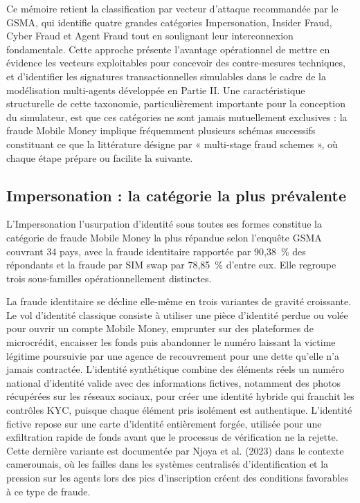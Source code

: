 \documentclass[11pt,a4paper,oneside]{report}
\theoremstyle{definition}
\theoremstyle{remark}
\begin{document}
Ce mémoire retient la classification par vecteur d'attaque recommandée par le GSMA, qui identifie quatre grandes catégories  Impersonation, Insider Fraud, Cyber Fraud et Agent Fraud  tout en soulignant leur interconnexion fondamentale. Cette approche présente l'avantage opérationnel de mettre en évidence les vecteurs exploitables pour concevoir des contre-mesures techniques, et d'identifier les signatures transactionnelles simulables dans le cadre de la modélisation multi-agents développée en Partie II. Une caractéristique structurelle de cette taxonomie, particulièrement importante pour la conception du simulateur, est que ces catégories ne sont jamais mutuellement exclusives : la fraude Mobile Money implique fréquemment plusieurs schémas successifs constituant ce que la littérature désigne par « multi-stage fraud schemes », où chaque étape prépare ou facilite la suivante.

\subsection{Impersonation : la catégorie la plus prévalente}

L'Impersonation  l'usurpation d'identité sous toutes ses formes  constitue la catégorie de fraude Mobile Money la plus répandue selon l'enquête GSMA couvrant 34 pays, avec la fraude identitaire rapportée par 90,38~\% des répondants et la fraude par SIM swap par 78,85~\% d'entre eux. Elle regroupe trois sous-familles opérationnellement distinctes.

La fraude identitaire se décline elle-même en trois variantes de gravité croissante. Le vol d'identité classique consiste à utiliser une pièce d'identité perdue ou volée pour ouvrir un compte Mobile Money, emprunter sur des plateformes de microcrédit, encaisser les fonds puis abandonner le numéro  laissant la victime légitime poursuivie par une agence de recouvrement pour une dette qu'elle n'a jamais contractée. L'identité synthétique combine des éléments réels  un numéro national d'identité valide  avec des informations fictives, notamment des photos récupérées sur les réseaux sociaux, pour créer une identité hybride qui franchit les contrôles KYC, puisque chaque élément pris isolément est authentique. L'identité fictive repose sur une carte d'identité entièrement forgée, utilisée pour une exfiltration rapide de fonds avant que le processus de vérification ne la rejette. Cette dernière variante est documentée par Njoya et al. (2023) dans le contexte camerounais, où les failles dans les systèmes centralisés d'identification et la pression sur les agents lors des pics d'inscription créent des conditions favorables à ce type de fraude.
\end{document}
